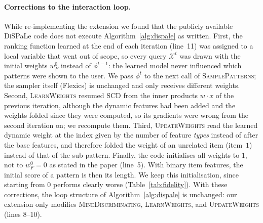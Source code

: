 \documentclass[sigconf]{acmart}
\begin{document}
\paragraph{Corrections to the interaction loop.}
While re-implementing the extension we found that the publicly available DiSPaLe code does not execute Algorithm~\ref{alg:dispale} as written. First, the ranking function learned at the end of each iteration (line~11) was assigned to a local variable that went out of scope, so every query $\mathcal X^t$ was drawn with the initial weights $w_F^0$ instead of $\phi^{t-1}$: the learned model never influenced which patterns were shown to the user. We pass $\phi^t$ to the next call of \textsc{SamplePatterns}; the sampler itself (Flexics) is unchanged and only receives different weights. Second, \textsc{LearnWeights} resumed SCD from the inner products $w\cdot x$ of the previous iteration, although the dynamic features had been added and the weights folded since they were computed, so its gradients were wrong from the second iteration on; we recompute them. Third, \textsc{UpdateWeights} read the learned dynamic weight at the index given by the number of feature \emph{types} instead of after the base features, and therefore folded the weight of an unrelated item (item~$1$) instead of that of the sub-pattern. Finally, the code initialises all weights to $1$, not to $w_F^0=0$ as stated in the paper (line~5). With binary item features, the initial score of a pattern is then its length. We keep this initialisation, since starting from $0$ performs clearly worse (Table~\ref{tab:fidelity}). With these corrections, the loop structure of Algorithm~\ref{alg:dispale} is unchanged: our extension only modifies \textsc{MineDiscriminating}, \textsc{LearnWeights}, and \textsc{UpdateWeights} (lines 8--10).
\end{document}
